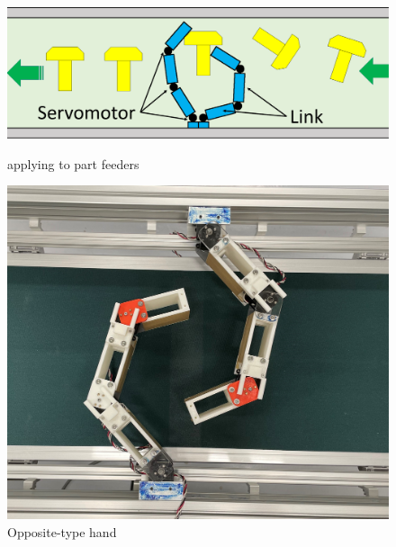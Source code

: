 \documentclass[a4paper,papersize,dvipdfmx]{mtabst}
\begin{document}
\begin{figure}[t]
	\centering
	\begin{minipage}{0.7\linewidth}
	\includegraphics[width=0.9\linewidth]{fig/abstract/part_feeder.pdf}
	\caption{applying to part feeders}
	\label{fig::partfeeder}
	\end{minipage}\hfill
	\begin{minipage}{0.29\linewidth}
	\includegraphics[width=0.95\linewidth]{fig/abstract/opposite2.jpg}
	\caption{Opposite-type hand}
	\label{fig::oppositehand}
	\end{minipage}
	

\end{figure}
\end{document}
